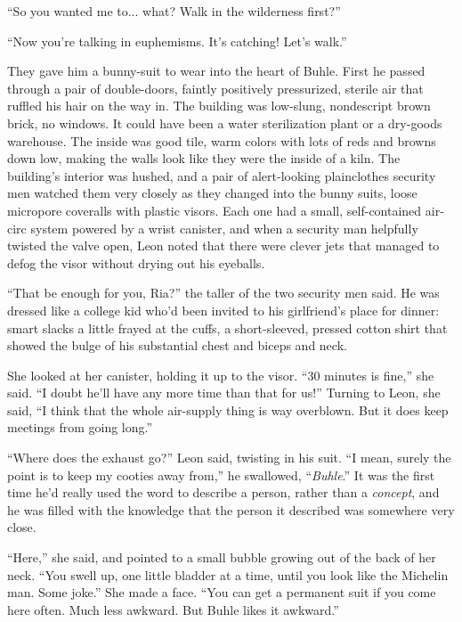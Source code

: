 “So you wanted me to... what? Walk in the wilderness first?”

“Now you're talking in euphemisms. It's catching! Let's walk.”

\tb

They gave him a bunny-suit to wear into the heart of Buhle. First he 
passed through a pair of double-doors, faintly positively pressurized, 
sterile air that ruffled his hair on the way in. The building was 
low-slung, nondescript brown brick, no windows. It could have been a 
water sterilization plant or a dry-goods warehouse. The inside was good 
tile, warm colors with lots of reds and browns down low, making the 
walls look like they were the inside of a kiln. The building's interior 
was hushed, and a pair of alert-looking plainclothes security men 
watched them very closely as they changed into the bunny suits, loose 
micropore coveralls with plastic visors. Each one had a small, 
self-contained air-circ system powered by a wrist canister, and when a 
security man helpfully twisted the valve open, Leon noted that there 
were clever jets that managed to defog the visor without drying out his 
eyeballs.

“That be enough for you, Ria?” the taller of the two security men 
said. He was dressed like a college kid who'd been invited to his 
girlfriend's place for dinner: smart slacks a little frayed at the 
cuffs, a short-sleeved, pressed cotton shirt that showed the bulge of 
his substantial chest and biceps and neck.

She looked at her canister, holding it up to the visor. “30 minutes 
is fine,” she said. “I doubt he'll have any more time than that for 
us!” Turning to Leon, she said, “I think that the whole air-supply 
thing is way overblown. But it does keep meetings from going long.”

“Where does the exhaust go?” Leon said, twisting in his suit. “I 
mean, surely the point is to keep my cooties away from,” he 
swallowed, “\emph{Buhle}.” It was the first time he'd really used 
the word to describe a person, rather than a \emph{concept}, and he was 
filled with the knowledge that the person it described was somewhere 
very close.

“Here,” she said, and pointed to a small bubble growing out of the 
back of her neck. “You swell up, one little bladder at a time, until 
you look like the Michelin man. Some joke.” She made a face. “You 
can get a permanent suit if you come here often. Much less awkward. But 
Buhle likes it awkward.”

